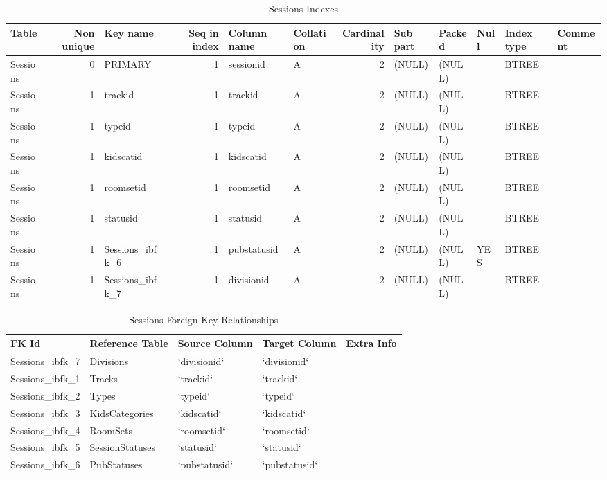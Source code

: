 \documentclass[captions=tablesignature]{scrartcl}
\begin{document}
\begin{table}[htb]
\caption{\label{tbl:sessionsindexes}Sessions Indexes}
\centering
\begin{tabular}{lrlrllrlllll}
\hline
Table & Non unique & Key name & Seq in index & Column name & Collation & Cardinality & Sub part & Packed & Null & Index type & Comment\\
\hline
Sessions & 0 & PRIMARY & 1 & sessionid & A & 2 & (NULL) & (NULL) &  & BTREE & \\
Sessions & 1 & trackid & 1 & trackid & A & 2 & (NULL) & (NULL) &  & BTREE & \\
Sessions & 1 & typeid & 1 & typeid & A & 2 & (NULL) & (NULL) &  & BTREE & \\
Sessions & 1 & kidscatid & 1 & kidscatid & A & 2 & (NULL) & (NULL) &  & BTREE & \\
Sessions & 1 & roomsetid & 1 & roomsetid & A & 2 & (NULL) & (NULL) &  & BTREE & \\
Sessions & 1 & statusid & 1 & statusid & A & 2 & (NULL) & (NULL) &  & BTREE & \\
Sessions & 1 & Sessions\_ibfk\_6 & 1 & pubstatusid & A & 2 & (NULL) & (NULL) & YES & BTREE & \\
Sessions & 1 & Sessions\_ibfk\_7 & 1 & divisionid & A & 2 & (NULL) & (NULL) &  & BTREE & \\
\hline
\end{tabular}
\end{table}

\begin{table}[htb]
\caption{\label{tbl:sessionsfkr}Sessions Foreign Key Relationships}
\centering
\begin{tabular}{lllll}
\hline
FK Id & Reference Table & Source Column & Target Column & Extra Info\\
\hline
Sessions\_ibfk\_7 & Divisions & `divisionid` & `divisionid` & \\
Sessions\_ibfk\_1 & Tracks & `trackid` & `trackid` & \\
Sessions\_ibfk\_2 & Types & `typeid` & `typeid` & \\
Sessions\_ibfk\_3 & KidsCategories & `kidscatid` & `kidscatid` & \\
Sessions\_ibfk\_4 & RoomSets & `roomsetid` & `roomsetid` & \\
Sessions\_ibfk\_5 & SessionStatuses & `statusid` & `statusid` & \\
Sessions\_ibfk\_6 & PubStatuses & `pubstatusid` & `pubstatusid` & \\
\hline
\end{tabular}
\end{table}
\end{document}
